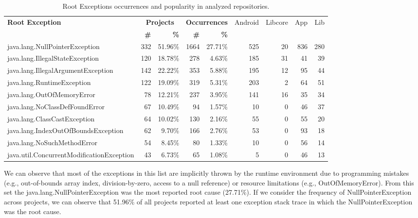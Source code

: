 \begin{table}
  \tiny
  \centering
  \begin{tabular}{lrrrrrrrr}
    \hline
    \bfseries{Root Exception} &  \multicolumn{2}{c}{\bfseries{Projects}} &  \multicolumn{2}{c}{\bfseries{Occurrences}} & \textsf{Android} & \textsf{Libcore} & \textsf{App} & \textsf{Lib} \\
    & \bfseries{\#} &  \bfseries{\%} & \bfseries{\# } & \bfseries{\% } &&&&\\
    \hline

java.lang.NullPointerException	&	332	&	51.96\%	&	1664	&	27.71\%	&	525	&	20	&	836	&	280	\\
java.lang.IllegalStateException	&	120	&	18.78\%	&	278	&	4.63\%	&	185	&	31	&	41	&	39	\\
java.lang.IllegalArgumentException	&	142	&	22.22\%	&	353	&	5.88\%	&	195	&	12	&	95	&	44	\\
java.lang.RuntimeException	&	122	&	19.09\%	&	319	&	5.31\%	&	203	&	2	&	64	&	51	\\
java.lang.OutOfMemoryError	&	78	&	12.21\%	&	237	&	3.95\%	&	141	&	16	&	35	&	34	\\
java.lang.NoClassDefFoundError	&	67	&	10.49\%	&	94	&	1.57\%	&	10	&	0	&	46	&	37	\\
java.lang.ClassCastException	&	64	&	10.02\%	&	130	&	2.16\%	&	55	&	0	&	55	&	20	\\
java.lang.IndexOutOfBoundsException	&	62	&	9.70\%	&	166	&	2.76\%	&	53	&	0	&	93	&	18	\\
java.lang.NoSuchMethodError	&	54	&	8.45\%	&	80	&	1.33\%	&	10	&	0	&	56	&	14	\\
java.util.ConcurrentModificationException	&	43	&	6.73\%	&	65	&	1.08\%	&	5	&	0	&	46	&	13	\\
    \hline
  \end{tabular}
\caption{Root Exceptions occurrences and popularity in analyzed repositories.}
\label{tab:topten}
\end{table}
 
We can observe that most of the exceptions in this list are implicitly thrown by the
 runtime environment due to programming mistakes  (e.g., out-of-bounds array index, division-by-zero, access to a null reference)
 or resource limitations (e.g., OutOfMemoryError). 
From this set the java.lang.NullPointerException was the most reported root cause (27.71\%). 
If we consider the frequency of NullPointerException 
across projects, we can observe that 51.96\% of all projects reported at least one exception stack 
trace in which the NullPointerException was the root cause.

